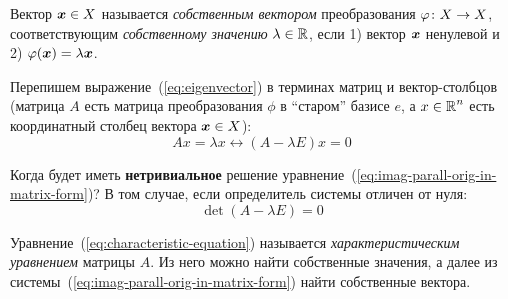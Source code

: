 \documentclass[a4paper,12pt]{article}
\begin{document}
  \begin{definition}
    Вектор $\bds x \hm\in X$ называется \emph{собственным вектором} преобразования $\phi\colon X \hm\to X$, соответствующим \emph{собственному значению} $\lambda \hm\in \RR$, если 1) вектор $\boldsymbol x$ ненулевой и 2) $\phi(\bds x) \hm= \lambda \bds x$.
  \end{definition}
  
  Перепишем выражение~(\ref{eq:eigenvector}) в терминах матриц и вектор-столбцов (матрица $A$ есть матрица преобразования $\phi$ в ``старом'' базисе $e$, а $x \hm\in \RR^n$ есть координатный столбец вектора $\bds x \hm\in X$):
  \begin{equation}\label{eq:imag-parall-orig-in-matrix-form}
    Ax = \lambda x \leftrightarrow \boxed{(A - \lambda E) x = 0}
  \end{equation}
  
  Когда будет иметь \textbf{нетривиальное} решение уравнение~(\ref{eq:imag-parall-orig-in-matrix-form})?
  В том случае, если определитель системы отличен от нуля:
  \begin{equation}\label{eq:characteristic-equation}
    \boxed{
      \det(A - \lambda E) = 0
    }
  \end{equation}
  
  Уравнение~(\ref{eq:characteristic-equation}) называется \emph{характеристическим уравнением} матрицы $A$.
  Из него можно найти собственные значения, а далее из системы~(\ref{eq:imag-parall-orig-in-matrix-form}) найти собственные вектора.
  
\end{document}
